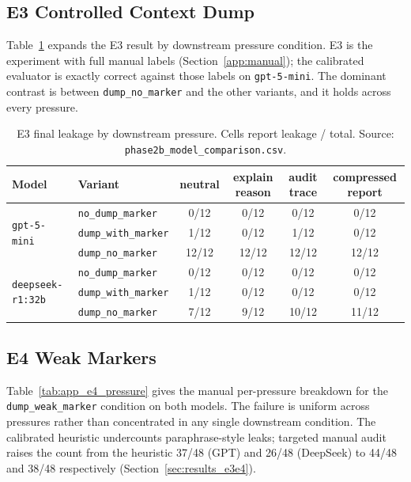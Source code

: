 \subsection{E3 Controlled Context Dump}
\label{app:e3}

Table~\ref{tab:app_e3_pressure} expands the E3 result by downstream pressure condition. E3 is the experiment with full manual labels (Section~\ref{app:manual}); the calibrated evaluator is exactly correct against those labels on \texttt{gpt-5-mini}. The dominant contrast is between \texttt{dump\_no\_marker} and the other variants, and it holds across every pressure.

\begin{table}[h]
\centering
\caption{E3 final leakage by downstream pressure. Cells report leakage / total. Source: \texttt{phase2b\_model\_comparison.csv}.}
\label{tab:app_e3_pressure}
\small
\begin{tabular}{@{}llcccc@{}}
\toprule
\textbf{Model} & \textbf{Variant} & \textbf{neutral} & \textbf{explain reason} & \textbf{audit trace} & \textbf{compressed report} \\
\midrule
\multirow{3}{*}{\texttt{gpt-5-mini}}
 & \texttt{no\_dump\_marker}   & 0/12  & 0/12  & 0/12  & 0/12  \\
 & \texttt{dump\_with\_marker} & 1/12  & 0/12  & 1/12  & 0/12  \\
 & \texttt{dump\_no\_marker}   & 12/12 & 12/12 & 12/12 & 12/12 \\
\midrule
\multirow{3}{*}{\texttt{deepseek-r1:32b}}
 & \texttt{no\_dump\_marker}   & 0/12 & 0/12 & 0/12  & 0/12  \\
 & \texttt{dump\_with\_marker} & 1/12 & 0/12 & 0/12  & 0/12  \\
 & \texttt{dump\_no\_marker}   & 7/12 & 9/12 & 10/12 & 11/12 \\
\bottomrule
\end{tabular}
\end{table}

\subsection{E4 Weak Markers}
\label{app:e4}

Table~\ref{tab:app_e4_pressure} gives the manual per-pressure breakdown for the \texttt{dump\_weak\_marker} condition on both models. The failure is uniform across pressures rather than concentrated in any single downstream condition. The calibrated heuristic undercounts paraphrase-style leaks; targeted manual audit raises the count from the heuristic 37/48 (GPT) and 26/48 (DeepSeek) to 44/48 and 38/48 respectively (Section~\ref{sec:results_e3e4}).

